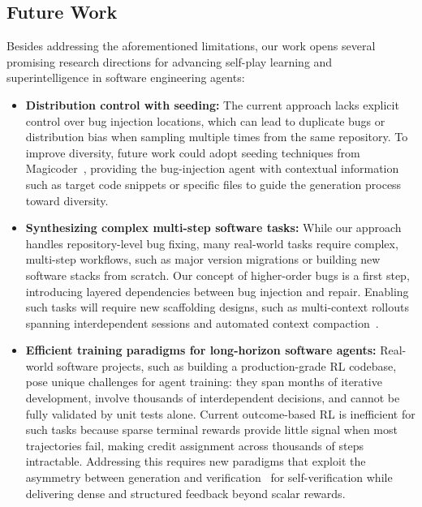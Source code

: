 \subsection{Future Work}
Besides addressing the aforementioned limitations, our work opens several promising research directions for advancing self-play learning and superintelligence in software engineering agents:
\begin{itemize}
\item{\bfseries Distribution control with seeding:}
The current approach lacks explicit control over bug injection locations, which can lead to duplicate bugs or distribution bias when sampling multiple times from the same repository. To improve diversity, future work could adopt seeding techniques from Magicoder~\cite{magicoder}, providing the bug-injection agent with contextual information such as target code snippets or specific files to guide the generation process toward diversity. 

\item{\bfseries Synthesizing complex multi-step software tasks:} While our approach handles repository-level bug fixing, many real-world tasks require complex, multi-step workflows, such as major version migrations or building new software stacks from scratch. Our concept of higher-order bugs is a first step, introducing layered dependencies between bug injection and repair.
Enabling such tasks will require new scaffolding designs, such as multi-context rollouts spanning interdependent sessions and automated context compaction~\cite{anthropic_context_editing_compaction,openai2025gpt52codex}.

\item{\bfseries Efficient training paradigms for long-horizon software agents:} Real-world software projects, such as building a production-grade RL codebase, pose unique challenges for agent training: they span months of iterative development, involve thousands of interdependent decisions, and cannot be fully validated by unit tests alone.
Current outcome-based RL is inefficient for such tasks because sparse terminal rewards provide little signal when most trajectories fail, making credit assignment across thousands of steps intractable.
Addressing this requires new paradigms that exploit the asymmetry between generation and verification~\cite{wei2025asymmetry} for self-verification while delivering dense and structured feedback beyond scalar rewards.
\end{itemize}

